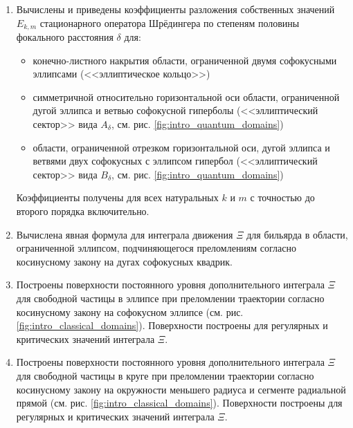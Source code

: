 {}
\begin{enumerate}[beginpenalty=10000] %
  \item Вычислены и приведены коэффициенты разложения собственных значений $E_{k,m}$ стационарного оператора Шрёдингера по степеням половины фокального расстояния $\delta$ для:
   \begin{itemize}[beginpenalty=10000] %
  \item конечно-листного накрытия области, ограниченной двумя софокусными эллипсами (<<эллиптическое кольцо>>) 
  \item симметричной относительно горизонтальной оси области, ограниченной дугой эллипса и ветвью софокусной  гиперболы (<<эллиптический сектор>> вида $A_\delta$, см. рис. \ref{fig:intro_quantum_domains})
  \item области, ограниченной отрезком горизонтальной оси, дугой эллипса и ветвями двух софокусных с эллипсом гипербол (<<эллиптический сектор>> вида $B_\delta$, см. рис. \ref{fig:intro_quantum_domains})
  \end{itemize}
  Коэффициенты получены для всех натуральных $k$ и $m$ с точностью до второго порядка включительно.

  \item Вычислена явная формула для интеграла движения $\Xi$ для бильярда в области, ограниченной эллипсом, подчиняющегося преломлениям согласно косинусному закону на дугах софокусных квадрик.
  \item Построены поверхности постоянного уровня дополнительного интеграла $\Xi$ для свободной частицы в эллипсе при преломлении траектории согласно косинусному закону на софокусном эллипсе (см. рис. \ref{fig:intro_classical_domains}). Поверхности построены для регулярных и критических значений интеграла $\Xi$.
   \item Построены поверхности постоянного уровня дополнительного интеграла $\Xi$ для свободной частицы в круге при преломлении траектории согласно косинусному закону на окружности меньшего радиуса и сегменте радиальной прямой (см. рис. \ref{fig:intro_classical_domains}). Поверхности построены для регулярных и критических значений интеграла $\Xi$.
\end{enumerate}



